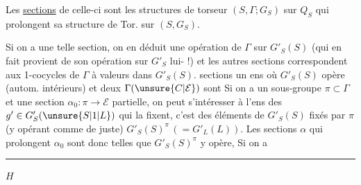 
Les \uline{sections} de celle-ci sont les structures de torseur  $(S,\Gamma;G_S)$ sur $Q_S$ qui prolongent sa structure de Tor. sur $(S,G_S)$.

Si on a une telle section, on en déduit une opération de $\Gamma$ sur $G'_S(S)$ (qui en fait provient de son opération sur $G'_S$ lui- !) et les autres sections correspondent aux 1-cocycles de $\Gamma$ à valeurs dans $G'_S(S)$.  sections   un ens où $G'_S(S)$ opère (autom. intérieurs) et deux  $\Gamma(\unsure{C|\mathcal E})$ sont  Si on a un sous-groupe $\pi\subset\Gamma$ et une section $\alpha_0:\pi\longrightarrow\mathcal E$ partielle, on peut s’intéresser à l’ens des $g'\in G'_S(\unsure{S|1|L})$ qui la fixent, c’est  des éléments de $G'_S(S)$ fixés par $\pi$ (y opérant comme de juste) $G'_S(S)^\pi\,(=\!G'_L(L))$. Les sections $\alpha$ qui prolongent $\alpha_0$ sont donc telles que $G'_S(S)^\pi$ y opère, Si on a

\noindent\rule{0.38\linewidth}{0.4pt}

$H$

